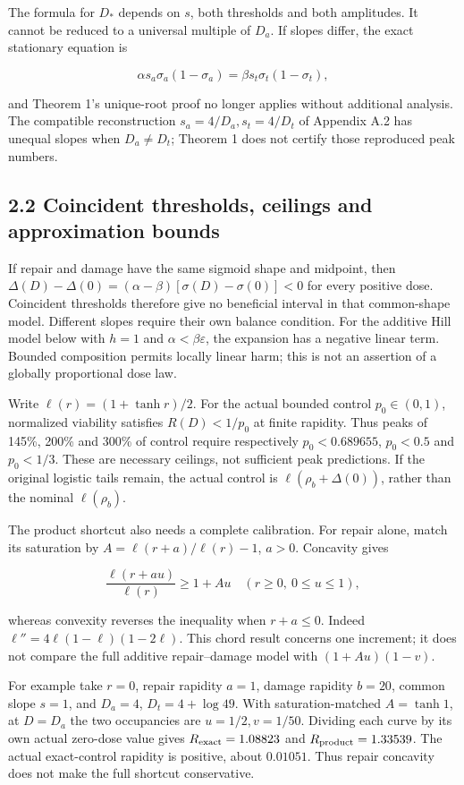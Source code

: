 \documentclass[
  11pt,
  a4paper,
]{article}
\begin{document}
The formula for \(D_*\) depends on \(s\), both thresholds and both amplitudes. It cannot be reduced to a universal multiple of \(D_a\). If slopes differ, the exact stationary equation is

\[\alpha s_a\sigma_a(1-\sigma_a)
=\beta s_t\sigma_t(1-\sigma_t),\]

and Theorem 1's unique-root proof no longer applies without additional analysis. The compatible reconstruction \(s_a=4/D_a,s_t=4/D_t\) of Appendix A.2 has unequal slopes when \(D_a\ne D_t\); Theorem 1 does not certify those reproduced peak numbers.

\subsection{2.2 Coincident thresholds, ceilings and approximation bounds}\label{coincident-thresholds-ceilings-and-approximation-bounds}

If repair and damage have the same sigmoid shape and midpoint, then \(\Delta(D)-\Delta(0)=(\alpha-\beta)[\sigma(D)-\sigma(0)]<0\) for every positive dose. Coincident thresholds therefore give no beneficial interval in that common-shape model. Different slopes require their own balance condition. For the additive Hill model below with \(h=1\) and \(\alpha<\beta\varepsilon\), the expansion has a negative linear term. Bounded composition permits locally linear harm; this is not an assertion of a globally proportional dose law.

Write \(\ell(r)=(1+\tanh r)/2\). For the actual bounded control \(p_0\in(0,1)\), normalized viability satisfies \(R(D)<1/p_0\) at finite rapidity. Thus peaks of 145\%, 200\% and 300\% of control require respectively \(p_0<0.689655\), \(p_0<0.5\) and \(p_0<1/3\). These are necessary ceilings, not sufficient peak predictions. If the original logistic tails remain, the actual control is \(\ell(\rho_b+\Delta(0))\), rather than the nominal \(\ell(\rho_b)\).

The product shortcut also needs a complete calibration. For repair alone, match its saturation by \(A=\ell(r+a)/\ell(r)-1\), \(a>0\). Concavity gives

\[\frac{\ell(r+au)}{\ell(r)}\ge1+Au\quad(r\ge0,\ 0\le u\le1),\]

whereas convexity reverses the inequality when \(r+a\le0\). Indeed \(\ell''=4\ell(1-\ell)(1-2\ell)\). This chord result concerns one increment; it does not compare the full additive repair--damage model with \((1+Au)(1-v)\).

For example take \(r=0\), repair rapidity \(a=1\), damage rapidity \(b=20\), common slope \(s=1\), and \(D_a=4\), \(D_t=4+\log49\). With saturation-matched \(A=\tanh1\), at \(D=D_a\) the two occupancies are \(u=1/2,v=1/50\). Dividing each curve by its own actual zero-dose value gives \(R_{\rm exact}=1.08823\) and \(R_{\rm product}=1.33539\). The actual exact-control rapidity is positive, about \(0.01051\). Thus repair concavity does not make the full shortcut conservative.
\end{document}
